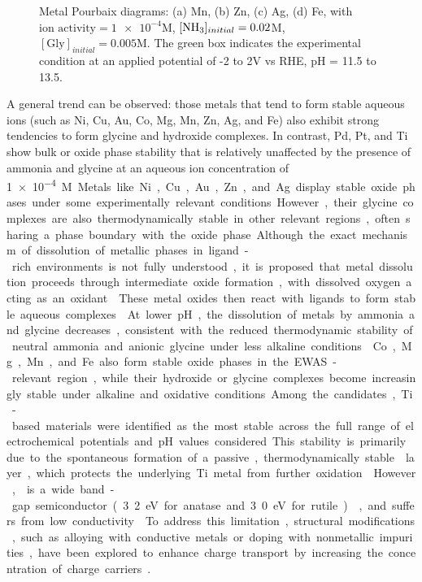 \documentclass[journal=jacsat,manuscript=article]{achemso}
\begin{document}
\begin{figure}[htbp]
\centering
{}
\caption{Metal Pourbaix diagrams: (a) Mn, (b) Zn, (c) Ag, (d) Fe, with $\text{ion activity}=\num{1e-4}$M, $[\ce{NH3}]_{initial}= 0.02$M, $[\text{Gly}]_{initial}=0.005$M. The green box indicates the experimental condition at an applied potential of -2 to 2V vs RHE, pH = 11.5 to 13.5.}
\label{fig:metal_pourbaix_collage_3}
\end{figure}

A general trend can be observed: those metals that tend to form stable aqueous ions (such as Ni, Cu, Au, Co, Mg, Mn, Zn, Ag, and Fe) also exhibit strong tendencies to form glycine and hydroxide complexes. In contrast, Pd, Pt, and Ti show bulk or oxide phase stability that is relatively unaffected by the presence of ammonia and glycine at an aqueous ion concentration of \SI{1e-4}M.

Metals like Ni, Cu, Au, Zn, and Ag display stable oxide phases under some experimentally relevant conditions. However, their glycine complexes are also thermodynamically stable in other relevant regions, often sharing a phase boundary with the oxide phase. Although the exact mechanism of dissolution of metallic phases in ligand-rich environments is not fully understood, it is proposed that metal dissolution proceeds through intermediate oxide formation, with dissolved oxygen acting as an oxidant \cite{Liao2012EffectsCopper, Ihnfeldt2008EffectNanohardness}. These metal oxides then react with ligands to form stable aqueous complexes \cite{Broeksma2023EvaluatingBoards, Du2004EffectIons, Ihnfeldt2008EffectNanohardness}. At lower pH, the dissolution of metals by ammonia and glycine decreases, consistent with the reduced thermodynamic stability of neutral ammonia and anionic glycine under less alkaline conditions \cite{Broeksma2023EvaluatingBoards}. Co, Mg, Mn, and Fe also form stable oxide phases in the EWAS-relevant region, while their hydroxide or glycine complexes become increasingly stable under alkaline and oxidative conditions.

Among the candidates, Ti-based materials were identified as the most stable across the full range of electrochemical potentials and pH values considered. This stability is primarily due to the spontaneous formation of a passive, thermodynamically stable  layer, which protects the underlying Ti metal from further oxidation \cite{Kuromoto2007TitaniumVoltages}. However,  is a wide band-gap semiconductor (3.2 eV for anatase and 3.0 eV for rutile) \cite{Earle1942TheDioxide, Bendavid1999StructuralDeposition}, and suffers from low conductivity \cite{Wu2014High-performanceApproach}. To address this limitation, structural modifications, such as alloying with conductive metals or doping with nonmetallic impurities, have been explored to enhance charge transport by increasing the concentration of charge carriers \cite{Chen_2007, Zheng2011FacilePhenol, Hahn2009SemimetallicNanotubes}.
\end{document}
